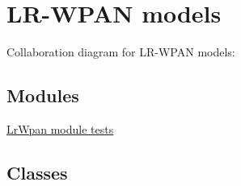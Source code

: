 \hypertarget{group__lr-wpan}{}\section{L\+R-\/\+W\+P\+AN models}
\label{group__lr-wpan}
Collaboration diagram for L\+R-\/\+W\+P\+AN models\+:
\subsection*{Modules}
\begin{DoxyCompactItemize}
\item 
\hyperlink{group__lr-wpan-test}{Lr\+Wpan module tests}
\end{DoxyCompactItemize}
\subsection*{Classes}

